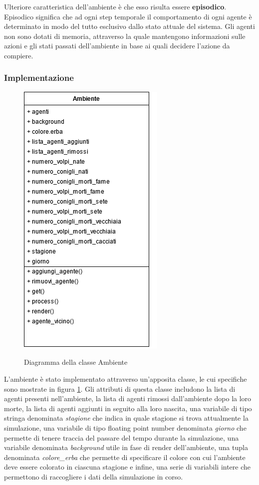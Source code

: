 \documentclass[11pt]{article}
\begin{document}
Ulteriore caratteristica dell'ambiente è che esso risulta essere \textbf{episodico}. Episodico significa che ad ogni step temporale il comportamento di ogni agente è determinato in modo del tutto esclusivo dallo stato attuale del sistema. Gli agenti non sono dotati di memoria, attraverso la quale mantengono informazioni sulle azioni e gli stati passati dell'ambiente in base ai quali decidere l'azione da compiere. 

\subsubsection{Implementazione}
\begin{figure}[h!]
     \centering
     \includegraphics[scale = 0.7]{Ambiente.png}
     \label{fig:ambienteUML}
     \caption{Diagramma della classe Ambiente}
\end{figure}

L'ambiente è stato implementato attraverso un'apposita classe, le cui specifiche sono mostrate in figura \ref{fig:ambienteUML}. Gli attributi di questa classe includono la lista di agenti presenti nell'ambiente, la lista di agenti rimossi dall'ambiente dopo la loro morte, la lista di agenti aggiunti in seguito alla loro nascita, una variabile di tipo stringa denominata \emph{stagione} che indica in quale stagione si trova attualmente la simulazione, una variabile di tipo floating point number denominata \emph{giorno} che permette di tenere traccia del passare del tempo durante la simulazione, una variabile denominata \emph{background} utile in fase di render dell'ambiente, una tupla denominata \emph{colore\_erba} che permette di specificare il colore con cui l'ambiente deve essere colorato in ciascuna stagione e infine, una serie di variabili intere che permettono di raccogliere i dati della simulazione in corso.
\end{document}
